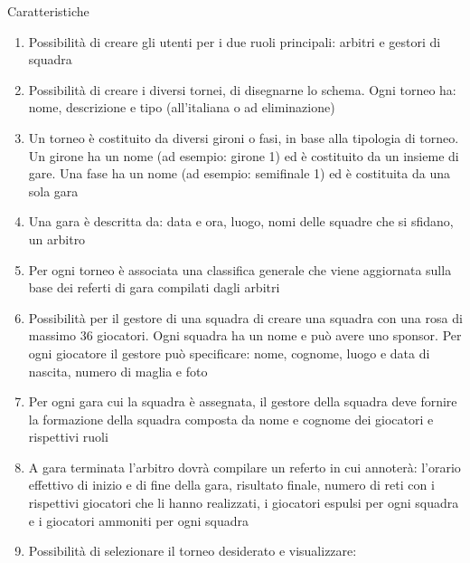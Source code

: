 \documentclass[10pt]{beamer}
\begin{document}
\begin{frame}[allowframebreaks]{Caratteristiche}
\begin{enumerate}
	
	\item
	\label{sf-uadmin}
	Possibilità di creare gli utenti per i due ruoli principali: arbitri e gestori di squadra
	
	\item
	Possibilità di creare i diversi tornei, di disegnarne lo schema. Ogni torneo ha: nome, descrizione e tipo (all'italiana o ad eliminazione)
	
	\item
	Un torneo è costituito da diversi gironi o fasi, in base alla tipologia di torneo. Un girone ha un nome (ad esempio: girone 1) ed è costituito da un insieme di gare. Una fase ha un nome (ad esempio: semifinale 1) ed è costituita da una sola gara
	
	\item
	Una gara è descritta da: data e ora, luogo, nomi delle squadre che si sfidano, un arbitro
	
	\item
	\label{ef-uadmin}
	Per ogni torneo è associata una classifica generale che viene aggiornata sulla base dei referti di gara compilati dagli arbitri

	\item
	\label{sf-ugestore}
	Possibilità per il gestore di una squadra di creare una squadra con una rosa di massimo 36 giocatori. Ogni squadra ha un nome e può avere uno sponsor. Per ogni giocatore il gestore può specificare: nome, cognome, luogo e data di nascita, numero di maglia e foto
	
	\item
	\label{ef-ugestore}
	Per ogni gara cui la squadra è assegnata, il gestore della squadra deve fornire la formazione della squadra composta da nome e cognome dei giocatori e rispettivi ruoli
	
	\item
	\label{f-uarbitro}
	A gara terminata l'arbitro dovrà compilare un referto in cui annoterà: l'orario effettivo di inizio e di fine della gara, risultato finale, numero di reti con i rispettivi giocatori che li hanno realizzati,  i giocatori espulsi per ogni squadra e i giocatori ammoniti per ogni squadra
	
\framebreak

	\item
	\label{f-upubblico}
	Possibilità di selezionare il torneo desiderato e visualizzare:
	

\end{enumerate}
\end{frame}
\end{document}
